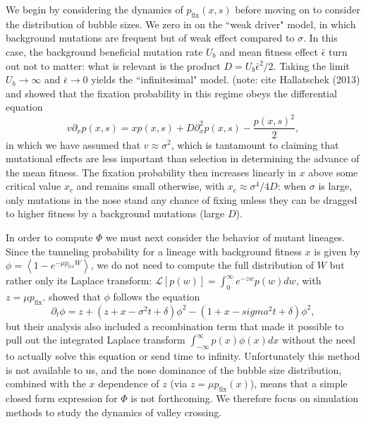\documentclass[rmp]{revtex4}
\begin{document}
We begin by considering the dynamics of $p_{\mathrm{fix}}(x,s)$ before moving on to consider the distribution of bubble sizes.
We zero in on the ``weak driver" model, in which background mutations are frequent but of weak effect compared to $\sigma$.
In this case, the background beneficial mutation rate $U_b$ and mean fitness effect $\bar{\epsilon}$ turn out not to matter: what is relevant is the product $D = U_b \bar{\epsilon}^2/2$.
Taking the limit $U_b \to \infty$ and $\bar{\epsilon} \to 0$ yields the ``infinitesimal" model.
(note: cite Hallatschek (2013) and \citet{good_2014} showed that the fixation probability in this regime obeys the differential equation 
\begin{equation}
v\partial_x p(x,s) = x p(x,s) + D\partial_x^2 p(x,s) - \frac{p(x,s)^2}{2},
\end{equation}
in which we have assumed that $v \approx \sigma^2$, which is tantamount to claiming that mutational effects are less important than selection in determining the advance of the mean fitness.
The fixation probability then increases linearly in $x$ above some critical value $x_c$ and remains small otherwise, with $x_c \approx \sigma^4/4D$: when $\sigma$ is large, only mutations in the nose stand any chance of fixing unless they can be dragged to higher fitness by a background mutations (large $D$).

In order to compute $\Phi$ we must next consider the behavior of mutant lineages.
Since the tunneling probability for a lineage with background fitness $x$ is given by $\phi = \left< 1 - e^{-\mu p_{\mathrm fix} W} \right>$, we do not need to compute the full distribution of $W$ but rather only its Laplace transform: $\mathcal{L}\left[ p(w) \right] = \int_0^\infty e^{-zw} p(w) dw$, with $z = \mu p_{\mathrm {fix}}$.
\citet{neher_shraiman_2011} showed that $\phi$ follows the equation
\begin{equation}
\partial_t \phi = z + (z + x - \sigma^2 t + \delta)\phi^2 - (1 + x - sigma^2 t + \delta)\phi^2,
\end{equation}
but their analysis also included a recombination term that made it possible to pull out the integrated Laplace transform $\int_{-\infty}^\infty p(x) \phi(x) dx$ without the need to actually solve this equation or send time to infinity.
Unfortunately this method is not available to us, and the nose dominance of the bubble size distribution, combined with the $x$ dependence of $z$ (via $z = \mu p_{\mathrm{fix}}(x)$), means that a simple closed form expression for $\Phi$ is not forthcoming.
We therefore focus on simulation methods to study the dynamics of valley crossing.
\end{document}
